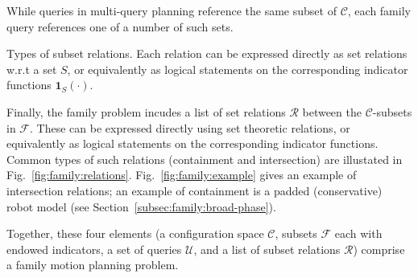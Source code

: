 \begin{marginfigure}
   \centering
   \vspace{-0.05in}
   \vspace{0.1in}
   \caption{While queries in multi-query planning reference
     the same subset of $\mathcal{C}$,
     each family query references one of a number of such sets.}
   \label{fig:family:query-to-subset}
\end{marginfigure}

\begin{marginfigure}
   \centering
   \vspace{-0.05in}
   \vspace{0.1in}
   \caption{Types of subset relations.
     Each relation can be expressed directly as set relations
     w.r.t a set $S$,
     or equivalently as logical statements
     on the corresponding indicator functions
     $\mathbf{1}_S(\cdot)$.}
   \label{fig:family:relations}
\end{marginfigure}

Finally, the family problem incudes a list of set relations
$\mathcal{R}$
between the $\mathcal{C}$-subsets in $\mathcal{F}$.
These can be expressed directly using set theoretic relations,
or equivalently as logical statements
on the corresponding indicator functions.
Common types of such relations
(containment and intersection)
are illustated in Fig.~\ref{fig:family:relations}.
Fig.~\ref{fig:family:example} gives an example of intersection relations;
an example of containment is a padded (conservative)
robot model (see Section~\ref{subsec:family:broad-phase}).

Together, these four elements
(a configuration space $\mathcal{C}$,
subsets $\mathcal{F}$ each with endowed indicators,
a set of queries $\mathcal{U}$,
and a list of subset relations $\mathcal{R}$)
comprise a family motion planning problem.

